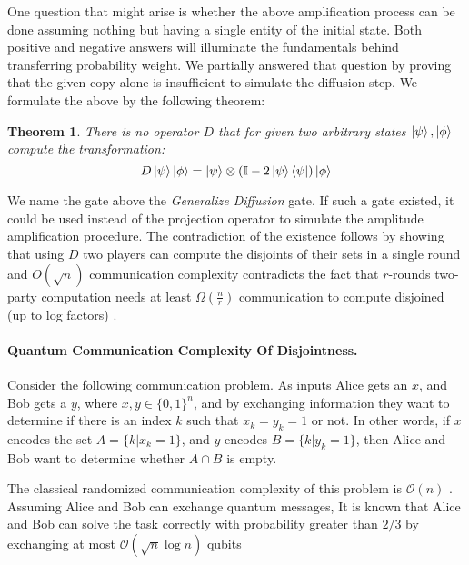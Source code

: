 \documentclass{article}
\newtheorem{theorem}{Theorem}
\newcommand{\commentt}[1]{\textcolor{blue}{ \textbf{[COMMENT]} #1}}
\newcommand{\ctt}[1]{\commentt{#1}}
\newcommand{\onotation}[1]{\(\mathcal{O} \left( {#1}  \right) \)}
\newcommand{\ona}[1]{\onotation{#1}}
\begin{document}
  One question that might arise is whether the above amplification process can be done assuming nothing but having a single entity of the initial state. Both positive and negative answers will illuminate the fundamentals behind transferring probability weight. We partially answered that question by proving that the given copy alone is insufficient to simulate the diffusion step. We formulate the above by the following theorem: 

  \begin{theorem} \textit{ There is no operator $D$ that for given two arbitrary states $\ket{\psi},\ket{\phi}$ compute the transformation:} 
\begin{equation*}
    D \ket{\psi}\ket{\phi} = \ket{\psi}\otimes\left( \mathbb{I} - 2 \ket{\psi}\bra{\psi} \right)\ket{\phi} 
\end{equation*}
\end{theorem}

We name the gate above the \textit{Generalize Diffusion} gate. If such a gate existed, it could be used instead of the projection operator to simulate the amplitude amplification procedure. The contradiction of the existence follows by showing that using $D$ two players can compute the disjoints of their sets in a single round and $O\left( \sqrt{n} \right)$ communication complexity contradicts the fact that $r$-rounds two-party computation needs at least $\Omega\left( \frac{n}{r} \right)$ communication to compute disjoined (up to log factors) \cite{Braverman}.    

\paragraph{Quantum Communication Complexity Of Disjointness.}
Consider the following communication problem.
As inputs Alice gets an \(x\), and Bob gets a \(y\), where \(x, y \in \{0, 1\}^n \), and by exchanging information they want to determine if there is an index \(k\) such that \(x_k = y_k = 1 \) or not. 
In other words, if \(x\) encodes the set \(A = \{k | x_k = 1\} \), and \(y\) encodes \(B = \{k | y_k = 1\}\), 
then Alice and Bob want to determine whether \( A \cap B \) is empty.

The classical randomized communication complexity of this problem is \ona{n} \cite{v003a011}.
Assuming Alice and Bob can exchange quantum messages, It is known that Alice and Bob can solve the task
correctly with probability greater than \(2/3\) by exchanging at most \ona{\sqrt{n}\log n } qubits %
\end{document}
